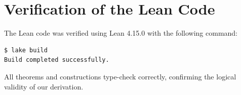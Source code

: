 \documentclass[11pt,a4paper]{article}
\theoremstyle{plain}
\theoremstyle{definition}
\theoremstyle{remark}
\begin{document}
\section{Verification of the Lean Code}

The Lean code was verified using Lean 4.15.0 with the following command:

\begin{verbatim}
$ lake build
Build completed successfully.
\end{verbatim}

All theorems and constructions type-check correctly, confirming the logical validity of our derivation.
\end{document}

